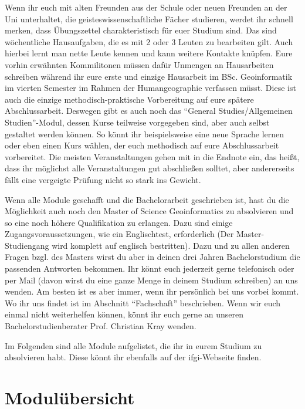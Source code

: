Wenn ihr euch mit alten Freunden aus der Schule oder neuen Freunden an der Uni unterhaltet, die geisteswissenschaftliche Fächer studieren, werdet ihr schnell merken, dass Übungszettel charakteristisch für euer Studium sind. Das sind wöchentliche Hausaufgaben, die es mit 2 oder 3 Leuten zu bearbeiten gilt. Auch hierbei lernt man nette Leute kennen und kann weitere Kontakte knüpfen. Eure vorhin erwähnten Kommilitonen müssen dafür Unmengen an Hausarbeiten schreiben während ihr eure erste und einzige Hausarbeit im BSc. Geoinformatik im vierten Semester im Rahmen der Humangeographie verfassen müsst. Diese ist auch die einzige methodisch-praktische Vorbereitung auf eure spätere Abschlussarbeit. Deswegen gibt es auch noch das "`General Studies/Allgemeinen Studien"'-Modul, dessen Kurse teilweise vorgegeben sind, aber auch selbst gestaltet werden können. So könnt ihr beispielsweise eine neue Sprache lernen oder eben einen Kurs wählen, der euch methodisch auf eure Abschlussarbeit vorbereitet. Die meisten Veranstaltungen gehen mit in die Endnote ein, das heißt, dass ihr möglichst alle Veranstaltungen gut abschließen solltet, aber andererseits fällt eine vergeigte Prüfung nicht so stark ins Gewicht.

Wenn alle Module geschafft und die Bachelorarbeit geschrieben ist, hast du die Möglichkeit auch noch den Master of Science Geoinformatics zu absolvieren und so eine noch höhere Qualifikation zu erlangen. Dazu sind einige Zugangsvoraussetzungen, wie ein Englischtest, erforderlich (Der Master-Studiengang wird komplett auf englisch bestritten). Dazu und zu allen anderen Fragen bzgl. des Masters wirst du aber in deinen drei Jahren Bachelorstudium die passenden Antworten bekommen. Ihr könnt euch jederzeit gerne telefonisch oder per Mail (davon wirst du eine ganze Menge in deinem Studium schreiben) an uns wenden. Am besten ist es aber immer, wenn ihr persönlich bei uns vorbei kommt. Wo ihr uns findet ist im Abschnitt "`Fachschaft"' beschrieben. Wenn wir euch einmal nicht weiterhelfen können, könnt ihr euch gerne an unseren Bachelorstudienberater Prof. Christian Kray wenden. 

Im Folgenden sind alle Module aufgelistet, die ihr in eurem Studium zu absolvieren habt. Diese könnt ihr ebenfalls auf der ifgi-Webseite ﬁnden.

\newpage

\section{Modulübersicht}

